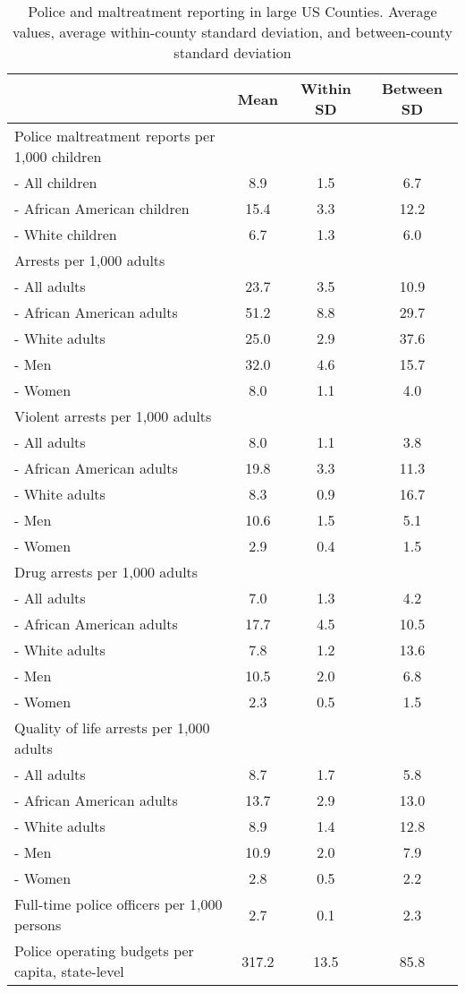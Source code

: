 \begin{table}[ht]
\centering
\caption{Police and maltreatment reporting in large US Counties. Average values, average within-county standard deviation, and between-county standard deviation} 
\label{desc3}
\begin{tabular}{lccc}
  \hline
  & Mean & Within SD & Between SD \\ 
  \hline
Police maltreatment reports per 1,000 children &  &  &  \\ 
         - All children & 8.9 & 1.5 & 6.7 \\ 
         - African American children & 15.4 & 3.3 & 12.2 \\ 
         - White children & 6.7 & 1.3 & 6.0 \\ 
  Arrests per 1,000 adults &  &  &  \\ 
         - All adults & 23.7 & 3.5 & 10.9 \\ 
         - African American adults & 51.2 & 8.8 & 29.7 \\ 
         - White adults & 25.0 & 2.9 & 37.6 \\ 
         - Men & 32.0 & 4.6 & 15.7 \\ 
         - Women & 8.0 & 1.1 & 4.0 \\ 
  Violent arrests per 1,000 adults &  &  &  \\ 
         - All adults & 8.0 & 1.1 & 3.8 \\ 
         - African American adults & 19.8 & 3.3 & 11.3 \\ 
         - White adults & 8.3 & 0.9 & 16.7 \\ 
         - Men & 10.6 & 1.5 & 5.1 \\ 
         - Women & 2.9 & 0.4 & 1.5 \\ 
  Drug arrests per 1,000 adults &  &  &  \\ 
         - All adults & 7.0 & 1.3 & 4.2 \\ 
         - African American adults & 17.7 & 4.5 & 10.5 \\ 
         - White adults & 7.8 & 1.2 & 13.6 \\ 
         - Men & 10.5 & 2.0 & 6.8 \\ 
         - Women & 2.3 & 0.5 & 1.5 \\ 
  Quality of life arrests per 1,000 adults &  &  &  \\ 
         - All adults & 8.7 & 1.7 & 5.8 \\ 
         - African American adults & 13.7 & 2.9 & 13.0 \\ 
         - White adults & 8.9 & 1.4 & 12.8 \\ 
         - Men & 10.9 & 2.0 & 7.9 \\ 
         - Women & 2.8 & 0.5 & 2.2 \\ 
  Full-time police officers per 1,000 persons & 2.7 & 0.1 & 2.3 \\ 
  Police operating budgets per capita, state-level & 317.2 & 13.5 & 85.8 \\ 
   \hline
\end{tabular}
\end{table}
